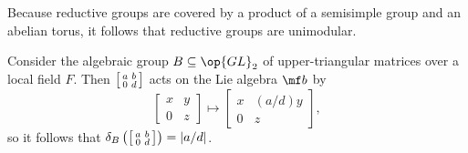 \documentclass[../notes.tex]{subfiles}
\begin{document}
\begin{example}
	Because reductive groups are covered by a product of a semisimple group and an abelian torus, it follows that reductive groups are unimodular.
\end{example}
\begin{example}
	Consider the algebraic group $B\subseteq\op{GL}_2$ of upper-triangular matrices over a local field $F$. Then $\begin{bsmallmatrix}
		a & b \\ 0 & d
	\end{bsmallmatrix}$ acts on the Lie algebra $\mf b$ by
	\[\begin{bmatrix}
		x & y \\ 0 & z
	\end{bmatrix}\mapsto\begin{bmatrix}
		x & (a/d)y \\ 0 & z
	\end{bmatrix},\]
	so it follows that $\delta_B\left(\begin{bsmallmatrix}
		a & b \\ 0 & d
	\end{bsmallmatrix}\right)=\left|a/d\right|$.
\end{example}
\end{document}
